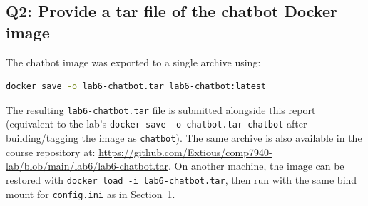 \documentclass[11pt]{article}
\begin{document}
\subsection*{Q2: Provide a tar file of the chatbot Docker image}

The chatbot image was exported to a single archive using:

\begin{lstlisting}[language=bash]
docker save -o lab6-chatbot.tar lab6-chatbot:latest
\end{lstlisting}

The resulting \texttt{lab6-chatbot.tar} file is submitted alongside this report (equivalent to the lab's \texttt{docker save -o chatbot.tar chatbot} after building/tagging the image as \texttt{chatbot}).
The same archive is also available in the course repository at:
\url{https://github.com/Extious/comp7940-lab/blob/main/lab6/lab6-chatbot.tar}.
On another machine, the image can be restored with \texttt{docker load -i lab6-chatbot.tar}, then run with the same bind mount for \texttt{config.ini} as in Section~1.



\end{document}
